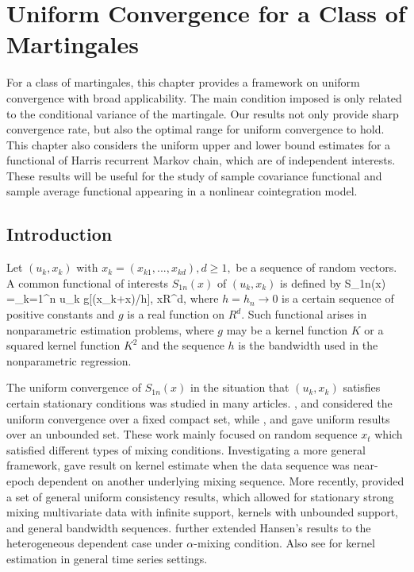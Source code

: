
\chapter{Uniform Convergence for a Class of Martingales} 
\ifpdf
    \graphicspath{{Chapter1/Chapter1Figs/PNG/}{Chapter1/Chapter1Figs/PDF/}{Chapter1/Chapter1Figs/}}
\else
    \graphicspath{{Chapter1/Chapter1Figs/EPS/}{Chapter1/Chapter1Figs/}}
\fi
For a class of martingales, this chapter provides a framework on uniform convergence with broad applicability. The main condition imposed is only related to the conditional variance of the martingale. Our results not only  provide sharp convergence rate, but also the optimal range for uniform convergence to hold. This chapter also considers the uniform upper and lower  bound estimates for a functional of Harris recurrent Markov chain, which  are of independent interests. These results will be useful for the study of sample covariance functional and sample average functional appearing in a nonlinear cointegration model.

\section{Introduction}
Let $(u_k, x_k)$ with $x_k=(x_{k1},..., x_{kd}), d\ge 1,$ be a sequence of random vectors. A common functional of interests $S_{1n}(x)$ of
$(u_k, x_k)$ is defined by
\be
  S_{1n}(x) =\sum_{k=1}^n u_k g[(x_k+x)/h], \quad x\in R^d,
\ee
where $h=h_n\to 0$ is a certain sequence of positive constants and $g$ is a real function on $R^d$. Such functional arises in nonparametric estimation problems, where $g$ may be a kernel function $K$ or a squared kernel function $K^{2}$ and the
sequence $h$ is the bandwidth used in the nonparametric regression.


The uniform convergence of $S_{1n}(x)$ in the situation that $(u_k, x_k)$ satisfies certain stationary conditions was studied in many articles. \cite{liero1989}, \cite{peligrad1992} and \cite{nzedoukhan2004} considered the uniform convergence over a fixed compact set, while \cite{masry1996}, \cite{bosq1998} and \cite{fanyao2003} gave uniform results over an unbounded set. These work mainly focused on random sequence $x_t$ which satisfied different types of mixing conditions. Investigating a more general framework, \cite{andrews1995} gave result on kernel estimate when the data sequence was near-epoch dependent on another underlying mixing sequence. More recently, \cite{hansen2008} provided a set of general uniform consistency results, which allowed for stationary strong mixing multivariate data with infinite support, kernels with unbounded support, and general bandwidth sequences. \cite{kristensen2009} further extended Hansen's results to the heterogeneous dependent case under $\alpha$-mixing condition. Also see \cite{wuhuanghuang2010} for kernel estimation in general time series settings.


